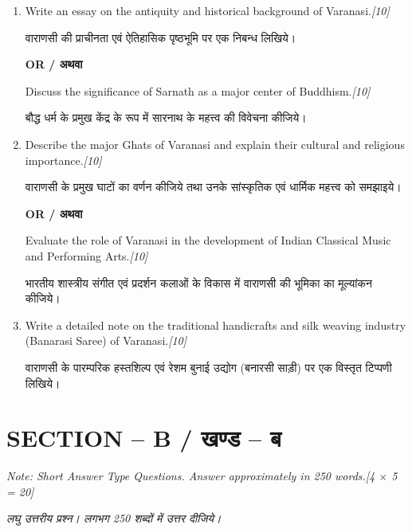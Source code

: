 \documentclass[11pt,a4paper]{article}
\newcommand{\pts}[1]{\hfill \textit{[#1]}}
\begin{document}
\begin{enumerate}[label=\textbf{\arabic*.},leftmargin=*,itemsep=12pt]

  \item Write an essay on the antiquity and historical background of Varanasi.\pts{10}
  
  वाराणसी की प्राचीनता एवं ऐतिहासिक पृष्ठभूमि पर एक निबन्ध लिखिये।

  \begin{center}\textbf{OR / अथवा}\end{center}

  Discuss the significance of Sarnath as a major center of Buddhism.\pts{10}
  
  बौद्ध धर्म के प्रमुख केंद्र के रूप में सारनाथ के महत्त्व की विवेचना कीजिये।

  \item Describe the major Ghats of Varanasi and explain their cultural and religious importance.\pts{10}
  
  वाराणसी के प्रमुख घाटों का वर्णन कीजिये तथा उनके सांस्कृतिक एवं धार्मिक महत्त्व को समझाइये।

  \begin{center}\textbf{OR / अथवा}\end{center}

  Evaluate the role of Varanasi in the development of Indian Classical Music and Performing Arts.\pts{10}
  
  भारतीय शास्त्रीय संगीत एवं प्रदर्शन कलाओं के विकास में वाराणसी की भूमिका का मूल्यांकन कीजिये।

  \item Write a detailed note on the traditional handicrafts and silk weaving industry (Banarasi Saree) of Varanasi.\pts{10}
  
  वाराणसी के पारम्परिक हस्तशिल्प एवं रेशम बुनाई उद्योग (बनारसी साड़ी) पर एक विस्तृत टिप्पणी लिखिये।

\end{enumerate}

\bigskip

\section*{SECTION -- B / खण्ड -- ब}
\noindent \textit{Note: Short Answer Type Questions. Answer approximately in 250 words.}\pts{4 $\times$ 5 = 20}

\noindent \textit{लघु उत्तरीय प्रश्न। लगभग 250 शब्दों में उत्तर दीजिये।}
\end{document}
